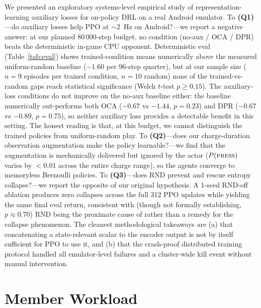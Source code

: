 \documentclass{article}
\begin{document}
We presented an exploratory systems-level empirical study of representation-learning
auxiliary losses for on-policy DRL on a real Android emulator. To
\textbf{(Q1)}---do auxiliary losses help PPO at $\sim$\SI{2}{\hertz}
on Android?---we report a negative answer: at our planned $80\,000$-step
budget, no condition (no-aux / OCA / DPR) beats the deterministic
in-game CPU opponent. Deterministic eval (Table~\ref{tab:eval})
shows trained-condition means numerically above the measured
uniform-random baseline ($-1.60$ per 96-step quarter), but at our
sample size ($n=9$ episodes per trained condition, $n=10$
random) none of the trained-vs-random gaps reach statistical
significance (Welch $t$-test $p \geq 0.15$). The auxiliary-loss
conditions do not improve on the no-aux baseline either: the
baseline numerically out-performs both OCA ($-0.67$ vs $-1.44$,
$p = 0.23$) and DPR ($-0.67$ vs $-0.89$, $p = 0.75$), so neither
auxiliary loss provides a detectable benefit in this setting.
The honest reading is that, at this budget, we cannot distinguish
the trained policies from uniform-random play. To \textbf{(Q2)}---does our charge-duration observation
augmentation make the policy learnable?---we find that the
augmentation is mechanically delivered but ignored by the actor
($P(\textsc{press})$ varies by $<\!0.01$ across the entire
charge range), so the agents converge to memoryless Bernoulli
policies. To \textbf{(Q3)}---does RND prevent and rescue entropy
collapse?---we report the opposite of our original hypothesis.
A 1-seed RND-off ablation produces zero collapses across the
full 312 PPO updates while yielding the same final eval return,
consistent with (though not formally establishing,
$p \approx 0.70$) RND being the proximate cause of rather than a
remedy for the collapse phenomenon. The cleanest methodological
takeaways are (a) that concatenating a state-relevant scalar to
the encoder output is not by itself sufficient for PPO to use
it, and (b) that the crash-proof distributed training protocol
handled all emulator-level failures and a cluster-wide kill
event without manual intervention.

\section*{Member Workload}
\label{sec:workload}
\end{document}
